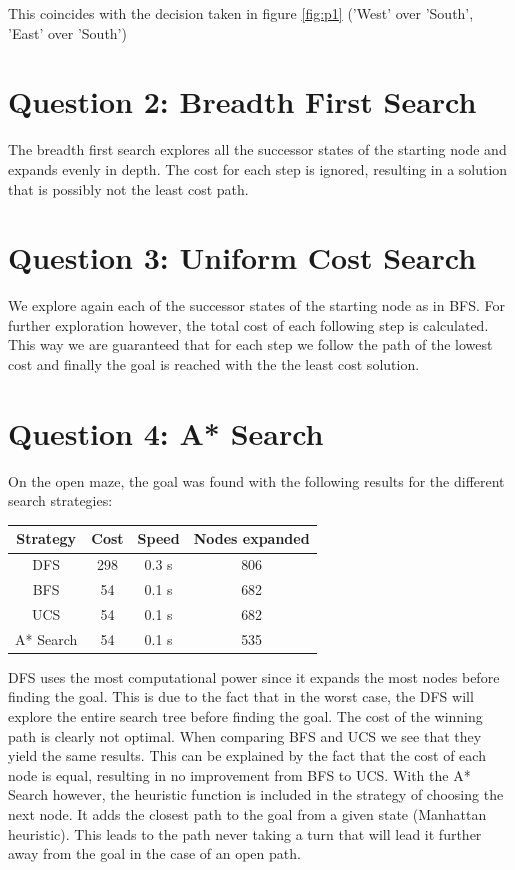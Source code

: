 \documentclass[onecolumn]{article}
\begin{document}
	This coincides with the decision taken in figure \ref{fig:p1} ('West' over 'South', 'East' over 'South')
		
	\section{Question 2: Breadth First Search}
	The breadth first search explores all the successor states of the starting node and expands evenly in depth. The cost for each step is ignored, resulting in a solution that is possibly not the least cost path.
	
		
	\section{Question 3: Uniform Cost Search}
	
	We explore again each of the successor states of the starting node as in BFS. For further exploration however, the total cost of each following step is calculated. This way we are guaranteed that for each step we follow the path of the lowest cost and finally the goal is reached with the the least cost solution. 
	
		
	\section{Question 4: A* Search}
	On the open maze, the goal was found with the following results for the different search strategies:\newline
	
	\begin{tabular}{|c|c|c|c|}
		\hline
		Strategy & Cost & Speed & Nodes expanded \\ \hline\hline 
		DFS & 298 & 0.3 s & 806 \\  				\hline
		BFS & 54 & 0.1 s & 682 \\ 					\hline
		UCS & 54 & 0.1 s & 682 \\ 					\hline
		A* Search & 54 & 0.1 s & 535\\ 				\hline
	\end{tabular} 
	\newline\newline\newline
	DFS uses the most computational power since it expands the most nodes before finding the goal. This is due to the fact that in the worst case, the DFS will explore the entire search tree before finding the goal. The cost of the winning path is clearly not optimal.\newline
	When comparing BFS and UCS we see that they yield the same results. This can be explained by the fact that the cost of each node is equal, resulting in no improvement from BFS to UCS. \newline
	With the A* Search however, the heuristic function is included in the strategy of choosing the next node. It adds the closest path to the goal from a given state (Manhattan heuristic). This leads to the path never taking a turn that will lead it further away from the goal in the case of an open path.
	
\end{document}
